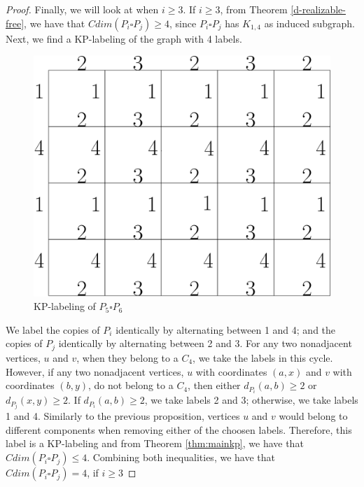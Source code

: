 \documentclass[12pt,a4paper,titlepage,openany]{report}
\begin{document}
\begin{proof}
Finally, we will look at when $i\geq 3$.
\newline
If $i\geq 3$, from Theorem \ref{d-realizable-free}, we have that $Cdim(P_i\square P_j)\geq 4$, since $P_i \square P_j$ has $K_{1,4}$ as induced subgraph.\newline
Next, we find a KP-labeling of the graph with 4 labels.
\begin{figure}[h]
\begin{center}
\includegraphics[width=1\linewidth]{figures/p_isqp_j.png}
\end{center}
\caption{KP-labeling of $P_5\square P_6$}
\end{figure}\newline
We label the copies of $P_i$ identically by alternating between 1 and 4; and the copies of $P_j$ identically by alternating between 2 and 3.\newline
For any two nonadjacent vertices, $u$ and $v$, when they belong to a $C_4$, we take the labels in this cycle. However, if any two nonadjacent vertices, $u$ with coordinates $(a,x)$ and $v$ with coordinates $(b,y)$, do not belong to a $C_4$, then either $d_{P_i}(a,b) \geq 2$ or $d_{P_j}(x,y) \ge 2$. If $d_{P_i}(a,b) \geq 2$, we take labels 2 and 3; otherwise, we take labels 1 and 4. Similarly to the previous proposition, vertices $u$ and $v$ would belong to different components when removing either of the choosen labels. 
 \newline
Therefore, this label is a KP-labeling and from Theorem \ref{thm:mainkp}, we have that $Cdim(P_i\square P_j)\leq 4$.\newline
Combining both inequalities, we have that $Cdim(P_i\square P_j)=4$, if $i\geq 3$
\end{proof}
\end{document}
